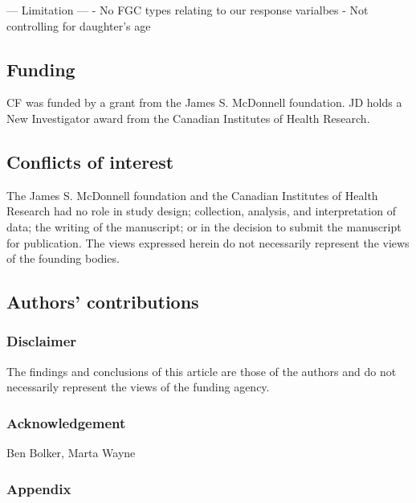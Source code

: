 \documentclass[12pt,]{article}
\begin{document}
— Limitation —
- No FGC types relating to our response varialbes
- Not controlling for daughter’s age


\subsection{Funding}\label{Funding}

CF was funded by a grant from the James S. McDonnell foundation. JD holds a New Investigator award from the Canadian Institutes of Health Research.

\subsection{Conflicts of interest}\label{Conflicts-of-Interest}

The James S. McDonnell foundation and the Canadian Institutes of Health Research had no role in study design; collection, analysis, and interpretation of data; the writing of the manuscript; or in the decision to submit the manuscript for publication.  The views expressed herein do not necessarily represent the views of the founding bodies.

\subsection{Authors' contributions}\label{Authors'-contributions}

\subsubsection{Disclaimer}\label{disclaimer}

The findings and conclusions of this article are those of the authors
and do not necessarily represent the views of the funding agency.

\subsubsection{Acknowledgement}\label{Acknowledgement}
Ben Bolker,  Marta Wayne

\subsubsection{Appendix}\label{appendix-1}


\end{document}
